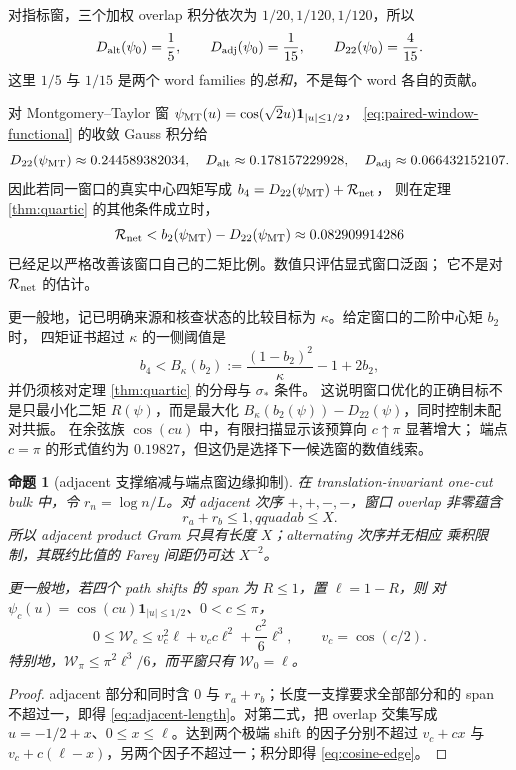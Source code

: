 \documentclass[UTF8,11pt,a4paper]{ctexart}
\newtheorem{proposition}[theorem]{命题}
\theoremstyle{definition}
\theoremstyle{remark}
\begin{document}
对指标窗，三个加权 overlap 积分依次为
$1/20,1/120,1/120$，所以
\[
 D_{\rm alt}(\psi_0)=\frac15,\qquad
 D_{\rm adj}(\psi_0)=\frac1{15},\qquad
 D_{22}(\psi_0)=\frac4{15}.
\]
这里 $1/5$ 与 $1/15$ 是两个 word families 的\emph{总和}，不是每个 word
各自的贡献。

对 Montgomery--Taylor 窗
$\psi_{\rm MT}(u)=\cos(\sqrt2u)\mathbf1_{|u|\le1/2}$，
\eqref{eq:paired-window-functional} 的收敛 Gauss 积分给
\[
 D_{22}(\psi_{\rm MT})\approx0.244589382034,
\quad
 D_{\rm alt}\approx0.178157229928,\quad
 D_{\rm adj}\approx0.066432152107.
\]
因此若同一窗口的真实中心四矩写成
$b_4=D_{22}(\psi_{\rm MT})+\mathcal R_{\rm net}$，
则在定理 \ref{thm:quartic} 的其他条件成立时，
\[
 \mathcal R_{\rm net}
 <b_2(\psi_{\rm MT})-D_{22}(\psi_{\rm MT})
 \approx0.082909914286
 \label{eq:mt-fourth-budget}
\]
已经足以严格改善该窗口自己的二矩比例。数值只评估显式窗口泛函；
它不是对 $\mathcal R_{\rm net}$ 的估计。

更一般地，记已明确来源和核查状态的比较目标为 $\kappa$。给定窗口的二阶中心矩 $b_2$ 时，
四矩证书超过 $\kappa$ 的一侧阈值是
\[
 b_4<B_\kappa(b_2)
 :=\frac{(1-b_2)^2}{\kappa}-1+2b_2,
 \label{eq:general-window-threshold}
\]
并仍须核对定理 \ref{thm:quartic} 的分母与 $\sigma_*$ 条件。
这说明窗口优化的正确目标不是只最小化二矩 $R(\psi)$，而是最大化
$B_\kappa(b_2(\psi))-D_{22}(\psi)$，同时控制未配对共振。
在余弦族 $\cos(cu)$ 中，有限扫描显示该预算向 $c\uparrow\pi$ 显著增大；
端点 $c=\pi$ 的形式值约为 $0.19827$，但这仍是选择下一候选窗的数值线索。

\begin{proposition}[adjacent 支撑缩减与端点窗边缘抑制]
\label{prop:path-support}
在 translation-invariant one-cut bulk 中，令
$r_n=\log n/L$。对 adjacent 次序 $+,+,-,-$，窗口 overlap 非零蕴含
\[
 r_a+r_b\le1,qquad ab\le X.
 \label{eq:adjacent-length}
\]
所以 adjacent product Gram 只具有长度 $X$；alternating 次序并无相应
乘积限制，其既约比值的 Farey 间距仍可达 $X^{-2}$。

更一般地，若四个 path shifts 的 span 为 $R\le1$，置 $\ell=1-R$，则
对 $\psi_c(u)=\cos(cu)\mathbf1_{|u|\le1/2}$、$0<c\le\pi$，
\[
 0\le\mathcal W_c
 \le v_c^2\ell+v_cc\ell^2+\frac{c^2}{6}\ell^3,
 \qquad v_c=\cos(c/2).
 \label{eq:cosine-edge}
\]
特别地，$\mathcal W_\pi\le\pi^2\ell^3/6$，而平窗只有
$\mathcal W_0=\ell$。
\end{proposition}

\begin{proof}
adjacent 部分和同时含 $0$ 与 $r_a+r_b$；长度一支撑要求全部部分和的
span 不超过一，即得 \eqref{eq:adjacent-length}。对第二式，把 overlap
交集写成 $u=-1/2+x$、$0\le x\le\ell$。达到两个极端 shift 的因子分别不超过
$v_c+cx$ 与 $v_c+c(\ell-x)$，另两个因子不超过一；积分即得
\eqref{eq:cosine-edge}。
\end{proof}
\end{document}
